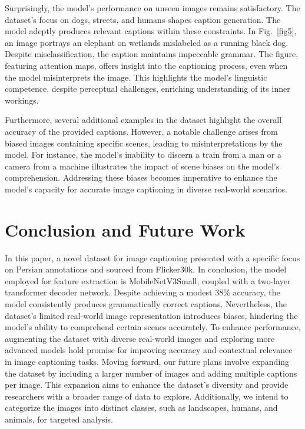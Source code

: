 \documentclass[lettersize,journal]{IEEEtran}
\begin{document}
Surprisingly, the model's performance on unseen images remains satisfactory. The dataset's focus on dogs, streets, and humans shapes caption generation. The model adeptly produces relevant captions within these constraints. In Fig.~\ref{fig5}, an image portrays an elephant on wetlands mislabeled as a running black dog. Despite misclassification, the caption maintains impeccable grammar. The figure, featuring attention maps, offers insight into the captioning process, even when the model misinterprets the image. This highlights the model's linguistic competence, despite perceptual challenges, enriching understanding of its inner workings.


Furthermore, several additional examples in the dataset highlight the overall accuracy of the provided captions. However, a notable challenge arises from biased images containing specific scenes, leading to misinterpretations by the model. For instance, the model's inability to discern a train from a man or a camera from a machine illustrates the impact of scene biases on the model's comprehension. Addressing these biases becomes imperative to enhance the model's capacity for accurate image captioning in diverse real-world scenarios.

\section{Conclusion and Future Work}
In this paper, a novel dataset for image captioning presented with a specific focus on Persian annotations and sourced from Flicker30k.
In conclusion, the model employed for feature extraction is MobileNetV3Small, coupled with a two-layer transformer decoder network. Despite achieving a modest 38\% accuracy, the model consistently produces grammatically correct captions. Nevertheless, the dataset's limited real-world image representation introduces biases, hindering the model's ability to comprehend certain scenes accurately. To enhance performance, augmenting the dataset with diverse real-world images and exploring more advanced models hold promise for improving accuracy and contextual relevance in image captioning tasks.
Moving forward, our future plans involve expanding the dataset by including a larger number of images and adding multiple captions per image. This expansion aims to enhance the dataset's diversity and provide researchers with a broader range of data to explore. Additionally, we intend to categorize the images into distinct classes, such as landscapes, humans, and animals, for targeted analysis.
\end{document}
